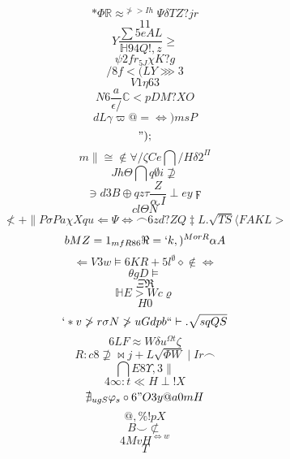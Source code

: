 \documentclass[12pt]{article}
\begin{document}
        \begin{minipage}[t][0pt]{\linewidth}

        \[*\Phi\mathbb{R}\approx^{\ngtr > I h}\Psi\delta T Z ? j r\]
\[11\]
\[Y\frac{\sum 5 e A L}{\mathbb{H} 9 4 Q ! , z}\geq\]
\[\psi 2 f r_{5J}\chi K ? g\]
\[/8f<(L {Y}\ggg 3\]
\[V1\eta 6 3\]
\[N6\frac{a}{\epsilon /}\mathbb{C} < p D M ? X O\]
\[dL\gamma\varpi @ =\iff ) m s P\]
\[");\]
\[m\parallel\cong\notin\forall /\zeta C e\bigcap / H\delta 2^{\Pi}\]
\[J {h}\Theta\bigcap q\emptyset i\nsupseteq\]
\[\ni d 3 B\oplus q z\tau\frac{Z}{\alpha . I}\perp e y\digamma\]
\[cl\Theta N\]
\[\nless +\parallel P\sigma P a\chi X q u\Leftarrow\Psi\Leftrightarrow\frown 6 z d ? Z Q\ddagger L .\sqrt{TS}\langle F A K L >\]
\[bMZ=1_{mfR86}\Re = ` k , )^{MorR}\alpha A\]
\[\Leftarrow V 3 w\models 6 K R + 5 l^{\emptyset}\diamond\notin\iff\]
\[\theta g D\models\]
\[\Xi\Re\]
\[\mathbb{H} E > W c\varrho\]
\[H0\]
\[`*v\ngtr r\sigma N\ngtr u G d p b ` `\vdash .\sqrt{sqQS}\]
\[6LF\approx W\delta u^{\Omega t}\zeta\]
\[R:c8\nsupseteq\bowtie j + L\sqrt{\Phi W}\mid I r\frown\]
\[\bigcap E 8\Upsilon , 3\parallel\]
\[4\infty : t\ll H\perp ! X\]
\[\nexists_{ugS}\varphi_{s}\circ 6 " O 3 y @ a 0 m H\]
\[@,\% ! p X\]
\[B\smile\not\subset\]
\[4MvH^{\Leftrightarrow w}\]
\[T
        \]
\end{minipage}
\end{document}

